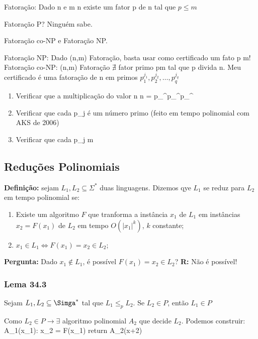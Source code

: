 \documentclass[a4paper,oneside,article,table]{article}
\begin{document}
        Fatoração: Dado n e m \leq n existe um fator p de n tal que $p \leq m$

        Fatoração \in P? Ninguém sabe.

        Fatoração \in co-NP e Fatoração \in NP.

        Fatoração \in NP: Dado (n,m) \in Fatoração, basta usar como certificado um fato p \leq m!
        Fatoração \in co-NP: (n,m) \notin Fatoração \rightarrow $\nexists$ fator primo p\leq m tal que p divida n. Meu certificado é uma fatoração de n em primos $p_{1}^{j_1}, p_{2}^{j_2}, \ldots, p_{q}^{j_q}$

        \begin{enumerate}
            \item Verificar que a multiplicação do valor n
                n = p_{}^{}p_{}^{}p_{}^{}

            \item Verificar que cada p_j é um número primo (feito em tempo polinomial com AKS de 2006)
            \item Verificar que cada p_j \ge m
        \end{enumerate}

        \subsection{Reduções Polinomiais}
        \textbf{Definição:} sejam $L_1, L_2 \subseteq \Sigma^*$ duas linguagens. Dizemos qye $L_1$ se reduz para $L_2$ em tempo polinomial se:
        \begin{enumerate}
            \item Existe um algoritmo $F$ que tranforma a instância $x_1$ de $L_1$ em instâncias $x_2 = F(x_1)$ de $L_2$ em tempo $O(|x_1|^k)$, $k$ constante;
            \item $x_1 \in L_1 \iff F(x_1) = x_2 \in L_2$;
        \end{enumerate}

        \textbf{Pergunta:} Dado $x_1 \notin L_1$, é possível $F(x_1) = x_2 \in L_2$?
        \textbf{R:} Não é possível!

        \subsubsection{Lema 34.3}
        Sejam $L_1, L_2 \subseteq \Simga^*$ tal que $L_1 {\leq}_p L_2$. Se $L_2 \in P$, então $L_1 \in P$

        Como $L_2 \in P \rightarrow \exists$ algoritmo polinomial $A_2$ que decide $L_2$. Podemos construir:
        A_1(x_1):
        x_2 = F(x_1)
        return A_2(x+2)
\end{document}
